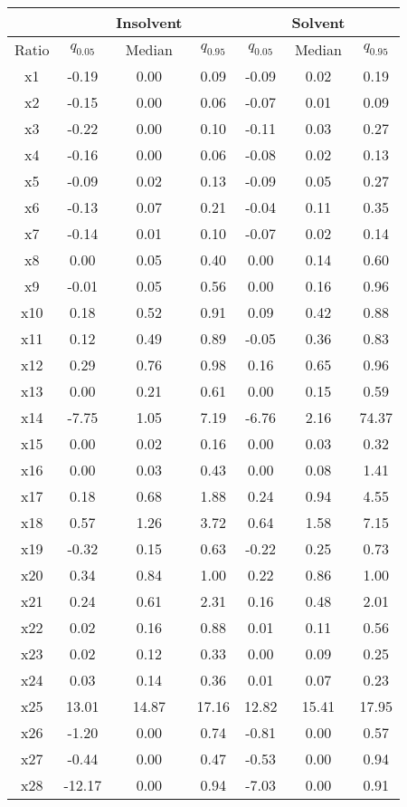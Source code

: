 \documentclass[11pt]{article}
\begin{document}
 \begin{center}
\footnotesize
\begin{tabular}{c|ccc|ccc} 
\hline\hline
&&Insolvent&&&Solvent&\\ 
\hline
Ratio & $q_{0.05}$ & Median & $q_{0.95}$ & $q_{0.05}$ & Median & $q_{0.95}$\\
\hline
x1 & -0.19 & 0.00 & 0.09 & -0.09 & 0.02 & 0.19\\
x2 & -0.15 & 0.00 & 0.06 & -0.07 & 0.01 & 0.09\\
x3 & -0.22 & 0.00 & 0.10 & -0.11 & 0.03 & 0.27\\
x4 & -0.16 & 0.00 & 0.06 & -0.08 & 0.02 & 0.13\\
x5 & -0.09 & 0.02 & 0.13 & -0.09 & 0.05 & 0.27\\
x6 & -0.13 & 0.07 & 0.21 & -0.04 & 0.11 & 0.35\\
x7 & -0.14 & 0.01 & 0.10 & -0.07 & 0.02 & 0.14\\
x8 & 0.00 & 0.05 & 0.40 & 0.00 & 0.14 & 0.60\\
x9 & -0.01 & 0.05 & 0.56 & 0.00 & 0.16 & 0.96\\
x10 & 0.18 & 0.52 & 0.91 & 0.09 & 0.42 & 0.88\\
x11 & 0.12 & 0.49 & 0.89 & -0.05 & 0.36 & 0.83\\
x12 & 0.29 & 0.76 & 0.98 & 0.16 & 0.65 & 0.96\\
x13 & 0.00 & 0.21 & 0.61 & 0.00 & 0.15 & 0.59\\
x14 & -7.75 & 1.05 & 7.19 & -6.76 & 2.16 & 74.37\\
x15 & 0.00 & 0.02 & 0.16 & 0.00 & 0.03 & 0.32\\
x16 & 0.00 & 0.03 & 0.43 & 0.00 & 0.08 & 1.41\\
x17 & 0.18 & 0.68 & 1.88 & 0.24 & 0.94 & 4.55\\
x18 & 0.57 & 1.26 & 3.72 & 0.64 & 1.58 & 7.15\\
x19 & -0.32 & 0.15 & 0.63 & -0.22 & 0.25 & 0.73\\
x20 & 0.34 & 0.84 & 1.00 & 0.22 & 0.86 & 1.00\\
x21 & 0.24 & 0.61 & 2.31 & 0.16 & 0.48 & 2.01\\
x22 & 0.02 & 0.16 & 0.88 & 0.01 & 0.11 & 0.56\\
x23 & 0.02 & 0.12 & 0.33 & 0.00 & 0.09 & 0.25\\
x24 & 0.03 & 0.14 & 0.36 & 0.01 & 0.07 & 0.23\\
x25 & 13.01 & 14.87 & 17.16 & 12.82 & 15.41 & 17.95\\
x26 & -1.20 & 0.00 & 0.74 & -0.81 & 0.00 & 0.57\\
x27 & -0.44 & 0.00 & 0.47 & -0.53 & 0.00 & 0.94\\
x28 & -12.17 & 0.00 & 0.94 & -7.03 & 0.00 & 0.91\\
\hline\hline
\end{tabular}
\end{center}
\end{document}
